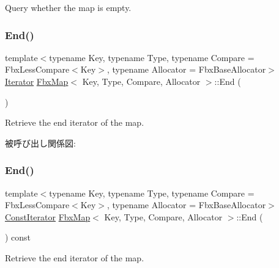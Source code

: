 Query whether the map is empty. 

\mbox{\label{class_fbx_map_aaaef5f105428c380732482c46ad4b826}} 
\subsubsection{\texorpdfstring{End()}{End()}\hspace{0.1cm}{\footnotesize\ttfamily [1/2]}}
{\footnotesize\ttfamily template$<$typename Key, typename Type, typename Compare = Fbx\+Less\+Compare$<$\+Key$>$, typename Allocator = Fbx\+Base\+Allocator$>$ \\
\hyperlink{class_fbx_map_ab0989f3b30c0c8652ff9ee1b28b5c1af}{Iterator} \hyperlink{class_fbx_map}{Fbx\+Map}$<$ Key, Type, Compare, Allocator $>$\+::End (\begin{DoxyParamCaption}{ }\end{DoxyParamCaption})}



Retrieve the end iterator of the map. 

被呼び出し関係図\+:
\mbox{\label{class_fbx_map_a76fc48a3c9243bcd747e6725a1e148b5}} 
\subsubsection{\texorpdfstring{End()}{End()}\hspace{0.1cm}{\footnotesize\ttfamily [2/2]}}
{\footnotesize\ttfamily template$<$typename Key, typename Type, typename Compare = Fbx\+Less\+Compare$<$\+Key$>$, typename Allocator = Fbx\+Base\+Allocator$>$ \\
\hyperlink{class_fbx_map_acf89f4bb5cf415e5e04087c2179bf367}{Const\+Iterator} \hyperlink{class_fbx_map}{Fbx\+Map}$<$ Key, Type, Compare, Allocator $>$\+::End (\begin{DoxyParamCaption}{ }\end{DoxyParamCaption}) const}



Retrieve the end iterator of the map. 

\mbox{\label{class_fbx_map_a39d841b85599678c497c960e060d3772}} 
